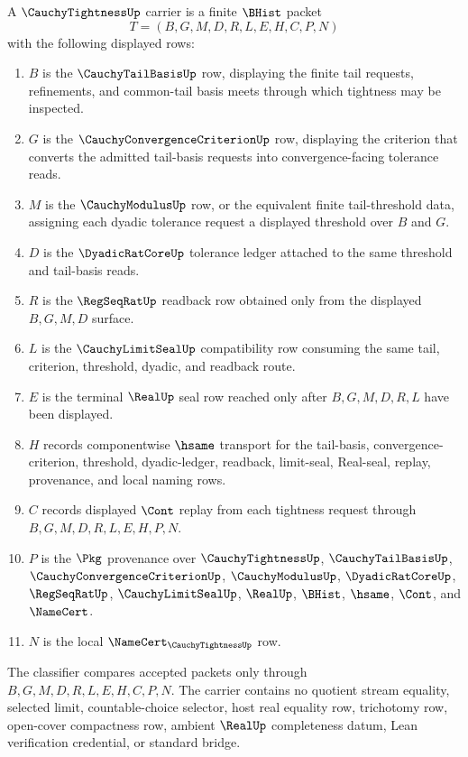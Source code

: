 \begin{definition}
\label{def:cauchy-tightness-carrier}
A $\CauchyTightnessUp$ carrier is a finite $\BHist$ packet
$$
T=(B,G,M,D,R,L,E,H,C,P,N)
$$
with the following displayed rows:
\begin{enumerate}
\item $B$ is the $\CauchyTailBasisUp$ row, displaying the finite tail requests, refinements, and common-tail basis meets through which tightness may be inspected.
\item $G$ is the $\CauchyConvergenceCriterionUp$ row, displaying the criterion that converts the admitted tail-basis requests into convergence-facing tolerance reads.
\item $M$ is the $\CauchyModulusUp$ row, or the equivalent finite tail-threshold data, assigning each dyadic tolerance request a displayed threshold over $B$ and $G$.
\item $D$ is the $\DyadicRatCoreUp$ tolerance ledger attached to the same threshold and tail-basis reads.
\item $R$ is the $\RegSeqRatUp$ readback row obtained only from the displayed $B,G,M,D$ surface.
\item $L$ is the $\CauchyLimitSealUp$ compatibility row consuming the same tail, criterion, threshold, dyadic, and readback route.
\item $E$ is the terminal $\RealUp$ seal row reached only after $B,G,M,D,R,L$ have been displayed.
\item $H$ records componentwise $\hsame$ transport for the tail-basis, convergence-criterion, threshold, dyadic-ledger, readback, limit-seal, Real-seal, replay, provenance, and local naming rows.
\item $C$ records displayed $\Cont$ replay from each tightness request through $B,G,M,D,R,L,E,H,P,N$.
\item $P$ is the $\Pkg$ provenance over $\CauchyTightnessUp$, $\CauchyTailBasisUp$, $\CauchyConvergenceCriterionUp$, $\CauchyModulusUp$, $\DyadicRatCoreUp$, $\RegSeqRatUp$, $\CauchyLimitSealUp$, $\RealUp$, $\BHist$, $\hsame$, $\Cont$, and $\NameCert$.
\item $N$ is the local $\NameCert_{\CauchyTightnessUp}$ row.
\end{enumerate}
The classifier compares accepted packets only through $B,G,M,D,R,L,E,H,C,P,N$. The carrier contains no quotient stream equality, selected limit, countable-choice selector, host real equality row, trichotomy row, open-cover compactness row, ambient $\RealUp$ completeness datum, Lean verification credential, or standard bridge.
\end{definition}

